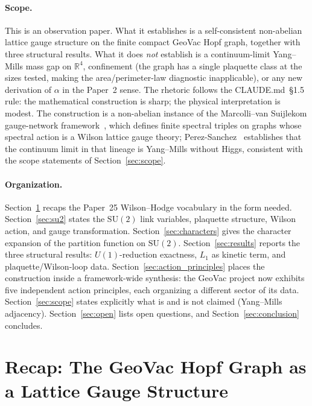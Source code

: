 \documentclass[11pt]{article}
\begin{document}
\paragraph*{Scope.}  This is an observation paper.  What it establishes
is a self-consistent non-abelian lattice gauge structure on the finite
compact GeoVac Hopf graph, together with three structural results.
What it does \emph{not} establish is a continuum-limit Yang--Mills mass
gap on $\mathbb{R}^4$, confinement (the graph has a single plaquette
class at the sizes tested, making the area/perimeter-law diagnostic
inapplicable), or any new derivation of $\alpha$ in the Paper~2 sense.
The rhetoric follows the CLAUDE.md~\S1.5 rule: the mathematical
construction is sharp; the physical interpretation is modest.  The
construction is a non-abelian instance of the Marcolli--van Suijlekom
gauge-network framework~\cite{marcolli_vs2014}, which defines finite
spectral triples on graphs whose spectral action is a Wilson lattice
gauge theory; Perez-Sanchez~\cite{perez_sanchez2024,perez_sanchez2025}
establishes that the continuum limit in that lineage is Yang--Mills
without Higgs, consistent with the scope statements of
Section~\ref{sec:scope}.

\paragraph*{Organization.}  Section~\ref{sec:recap} recaps the
Paper~25 Wilson--Hodge vocabulary in the form needed.
Section~\ref{sec:su2} states the $\mathrm{SU}(2)$ link variables,
plaquette structure, Wilson action, and gauge transformation.
Section~\ref{sec:characters} gives the character expansion of the
partition function on $\mathrm{SU}(2)$.  Section~\ref{sec:results}
reports the three structural results: $U(1)$-reduction exactness,
$L_1$ as kinetic term, and plaquette/Wilson-loop data.
Section~\ref{sec:action_principles} places the construction inside a
framework-wide synthesis: the GeoVac project now exhibits five
independent action principles, each organizing a different sector of
its data.  Section~\ref{sec:scope} states explicitly what is and is
not claimed (Yang--Mills adjacency).  Section~\ref{sec:open} lists
open questions, and Section~\ref{sec:conclusion} concludes.

\section{Recap: The GeoVac Hopf Graph as a Lattice Gauge Structure}
\label{sec:recap}
\end{document}
